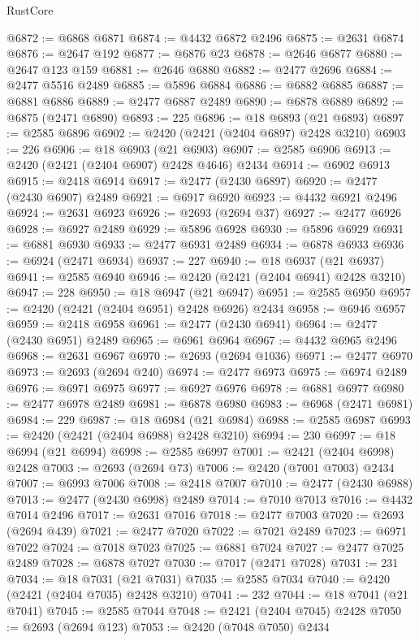 \begin{lexlean}{RustCore}
\begin{coremodule}
@6872 := @6868 @6871
@6874 := @4432 @6872 @2496
@6875 := @2631 @6874
@6876 := @2647 @192
@6877 := @6876 @23
@6878 := @2646 @6877
@6880 := @2647 @123 @159
@6881 := @2646 @6880
@6882 := @2477 @2696
@6884 := @2477 @5516 @2489
@6885 := @5896 @6884
@6886 := @6882 @6885
@6887 := @6881 @6886
@6889 := @2477 @6887 @2489
@6890 := @6878 @6889
@6892 := @6875 (@2471 @6890)
@6893 := 225
@6896 := @18 @6893 (@21 @6893)
@6897 := @2585 @6896
@6902 := @2420 (@2421 (@2404 @6897) @2428 @3210)
@6903 := 226
@6906 := @18 @6903 (@21 @6903)
@6907 := @2585 @6906
@6913 := @2420 (@2421 (@2404 @6907) @2428 @4646) @2434
@6914 := @6902 @6913
@6915 := @2418 @6914
@6917 := @2477 (@2430 @6897)
@6920 := @2477 (@2430 @6907) @2489
@6921 := @6917 @6920
@6923 := @4432 @6921 @2496
@6924 := @2631 @6923
@6926 := @2693 (@2694 @37)
@6927 := @2477 @6926
@6928 := @6927 @2489
@6929 := @5896 @6928
@6930 := @5896 @6929
@6931 := @6881 @6930
@6933 := @2477 @6931 @2489
@6934 := @6878 @6933
@6936 := @6924 (@2471 @6934)
@6937 := 227
@6940 := @18 @6937 (@21 @6937)
@6941 := @2585 @6940
@6946 := @2420 (@2421 (@2404 @6941) @2428 @3210)
@6947 := 228
@6950 := @18 @6947 (@21 @6947)
@6951 := @2585 @6950
@6957 := @2420 (@2421 (@2404 @6951) @2428 @6926) @2434
@6958 := @6946 @6957
@6959 := @2418 @6958
@6961 := @2477 (@2430 @6941)
@6964 := @2477 (@2430 @6951) @2489
@6965 := @6961 @6964
@6967 := @4432 @6965 @2496
@6968 := @2631 @6967
@6970 := @2693 (@2694 @1036)
@6971 := @2477 @6970
@6973 := @2693 (@2694 @240)
@6974 := @2477 @6973
@6975 := @6974 @2489
@6976 := @6971 @6975
@6977 := @6927 @6976
@6978 := @6881 @6977
@6980 := @2477 @6978 @2489
@6981 := @6878 @6980
@6983 := @6968 (@2471 @6981)
@6984 := 229
@6987 := @18 @6984 (@21 @6984)
@6988 := @2585 @6987
@6993 := @2420 (@2421 (@2404 @6988) @2428 @3210)
@6994 := 230
@6997 := @18 @6994 (@21 @6994)
@6998 := @2585 @6997
@7001 := @2421 (@2404 @6998) @2428
@7003 := @2693 (@2694 @73)
@7006 := @2420 (@7001 @7003) @2434
@7007 := @6993 @7006
@7008 := @2418 @7007
@7010 := @2477 (@2430 @6988)
@7013 := @2477 (@2430 @6998) @2489
@7014 := @7010 @7013
@7016 := @4432 @7014 @2496
@7017 := @2631 @7016
@7018 := @2477 @7003
@7020 := @2693 (@2694 @439)
@7021 := @2477 @7020
@7022 := @7021 @2489
@7023 := @6971 @7022
@7024 := @7018 @7023
@7025 := @6881 @7024
@7027 := @2477 @7025 @2489
@7028 := @6878 @7027
@7030 := @7017 (@2471 @7028)
@7031 := 231
@7034 := @18 @7031 (@21 @7031)
@7035 := @2585 @7034
@7040 := @2420 (@2421 (@2404 @7035) @2428 @3210)
@7041 := 232
@7044 := @18 @7041 (@21 @7041)
@7045 := @2585 @7044
@7048 := @2421 (@2404 @7045) @2428
@7050 := @2693 (@2694 @123)
@7053 := @2420 (@7048 @7050) @2434

\end{coremodule}
\end{lexlean}
